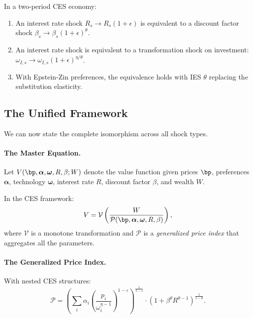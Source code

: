 \begin{proposition}
\label{prop:ac-iso-interest}
In a two-period CES economy:
\begin{enumerate}[label=(\roman*), nosep]
\item An interest rate shock $R_s \to R_s(1+\epsilon)$ is equivalent to a discount factor shock $\beta_s \to \beta_s (1+\epsilon)^{\theta}$.
\item An interest rate shock is equivalent to a transformation shock on investment: $\omega_{I,s} \to \omega_{I,s} (1+\epsilon)^{\eta/\theta}$.
\item With Epstein-Zin preferences, the equivalence holds with IES $\theta$ replacing the substitution elasticity.
\end{enumerate}
\end{proposition}

\subsection{The Unified Framework}
\label{subsec:ac-iso-unified}

We can now state the complete isomorphism across all shock types.

\paragraph{The Master Equation.}
Let $V(\bp, \boldsymbol{\alpha}, \boldsymbol{\omega}, R, \beta; W)$ denote the value function given prices $\bp$, preferences $\boldsymbol{\alpha}$, technology $\boldsymbol{\omega}$, interest rate $R$, discount factor $\beta$, and wealth $W$.

In the CES framework:
\begin{equation}
V = \mathcal{V}\left( \frac{W}{\mathcal{P}(\bp, \boldsymbol{\alpha}, \boldsymbol{\omega}, R, \beta)} \right),
\label{eq:ac-iso-value}
\end{equation}
where $\mathcal{V}$ is a monotone transformation and $\mathcal{P}$ is a \emph{generalized price index} that aggregates all the parameters.

\paragraph{The Generalized Price Index.}
With nested CES structures:
\begin{equation}
\mathcal{P} = \left( \sum_i \alpha_i \left( \frac{p_i}{\omega_i^{\eta-1}} \right)^{1-\varepsilon} \right)^{\frac{1}{1-\varepsilon}} \cdot \left( 1 + \beta^{\theta} R^{\theta-1} \right)^{\frac{1}{1-\theta}}.
\label{eq:ac-iso-P}
\end{equation}

